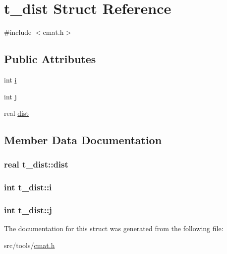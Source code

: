 \hypertarget{structt__dist}{\section{t\-\_\-dist \-Struct \-Reference}
\label{structt__dist}
}


{\ttfamily \#include $<$cmat.\-h$>$}

\subsection*{\-Public \-Attributes}
\begin{DoxyCompactItemize}
\item 
int \hyperlink{structt__dist_a40b1b2f55b9c48e368b8841e41fa014f}{i}
\item 
int \hyperlink{structt__dist_aa839d5b82ff9a788e1ea0c0573ad3553}{j}
\item 
real \hyperlink{structt__dist_a850aef618013116ad613a3036210028c}{dist}
\end{DoxyCompactItemize}


\subsection{\-Member \-Data \-Documentation}
\hypertarget{structt__dist_a850aef618013116ad613a3036210028c}{
\subsubsection[{dist}]{\setlength{\rightskip}{0pt plus 5cm}real {\bf t\-\_\-dist\-::dist}}}\label{structt__dist_a850aef618013116ad613a3036210028c}
\hypertarget{structt__dist_a40b1b2f55b9c48e368b8841e41fa014f}{
\subsubsection[{i}]{\setlength{\rightskip}{0pt plus 5cm}int {\bf t\-\_\-dist\-::i}}}\label{structt__dist_a40b1b2f55b9c48e368b8841e41fa014f}
\hypertarget{structt__dist_aa839d5b82ff9a788e1ea0c0573ad3553}{
\subsubsection[{j}]{\setlength{\rightskip}{0pt plus 5cm}int {\bf t\-\_\-dist\-::j}}}\label{structt__dist_aa839d5b82ff9a788e1ea0c0573ad3553}


\-The documentation for this struct was generated from the following file\-:\begin{DoxyCompactItemize}
\item 
src/tools/\hyperlink{cmat_8h}{cmat.\-h}\end{DoxyCompactItemize}
